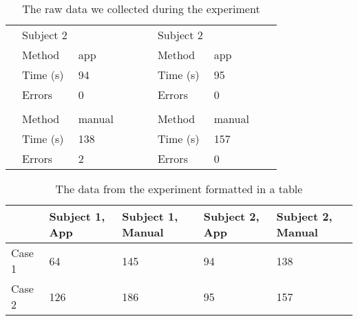 \begin{table}[!ht]
\begin{tabular}{l|l|l|lll|l|l|ll}
\cline{2-3}\cline{7-8}
                           & \multicolumn{1}{l}{Subject 2} &                      &  &  &                            & \multicolumn{1}{l}{Subject 2} &                      &  &   \\ 
\cline{2-3}\cline{7-8}
                           & Method                        & app                  &  &  &                            & Method                        & app                  &  &   \\ 
\cline{2-3}\cline{7-8}
                           & Time (s)                      & 94                   &  &  &                            & Time (s)                      & 95                   &  &   \\ 
\cline{2-3}\cline{7-8}
                           & Errors                        & 0                    &  &  &                            & Errors                        & 0                    &  &   \\ 
\cline{2-3}\cline{7-8}
                           &                               &                      &  &  &                            &                               &                      &  &   \\ 
\cline{2-3}\cline{7-8}
                           & Method                        & manual               &  &  &                            & Method                        & manual               &  &   \\ 
\cline{2-3}\cline{7-8}
                           & Time (s)                      & 138                  &  &  &                            & Time (s)                      & 157                  &  &   \\ 
\cline{2-3}\cline{7-8}
                           & Errors                        & 2                    &  &  &                            & Errors                        & 0                    &  &   \\
\cline{2-3}\cline{7-8}
\end{tabular}
\caption[Experiment results raw data]{The raw data we collected during the experiment}
\label{table:test-results-raw}
\end{table}


\begin{table}[!ht]
\centering
\begin{tabular}{|l|l|l|l|l|} 
\hline
       & Subject 1, App & Subject 1, Manual & Subject 2, App & Subject 2, Manual \\ 
\hline
Case 1 & 64             & 145               & 94             & 138               \\ 
\hline
Case 2 & 126            & 186               & 95             & 157               \\
\hline
\end{tabular}
\caption[Experiment results table]{The data from the experiment formatted in a table}
\label{table:test-results}
\end{table}


